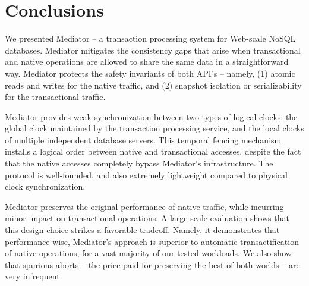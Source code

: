 \section{Conclusions}
\label{sec:conc}

We presented Mediator -- a transaction processing system
for Web-scale NoSQL databases. Mediator mitigates the consistency 
gaps that arise when transactional and native operations 
are allowed to share the same data in a straightforward way. Mediator 
protects the safety invariants of both API's -- namely, (1) atomic reads 
and writes for the native traffic, and (2) snapshot isolation or serializability
for the transactional traffic. 

Mediator provides weak synchronization between two types of logical clocks: 
the global clock maintained by the transaction processing service, and the 
local clocks of multiple independent database servers. This temporal
fencing mechanism installs a logical order between native
and transactional accesses, despite the fact that the native accesses completely 
bypass Mediator's infrastructure. The protocol is well-founded, and also 
extremely lightweight compared to physical clock synchronization.

Mediator preserves the original performance of native traffic, while incurring minor impact on transactional operations. A large-scale evaluation 
shows that this design choice strikes a favorable tradeoff. Namely, it demonstrates
that performance-wise, Mediator's approach is superior to automatic transactification 
of native operations, for a vast majority of our tested workloads. We also
show that spurious aborts -- the price paid for preserving 
the best of both worlds -- are very infrequent. 



